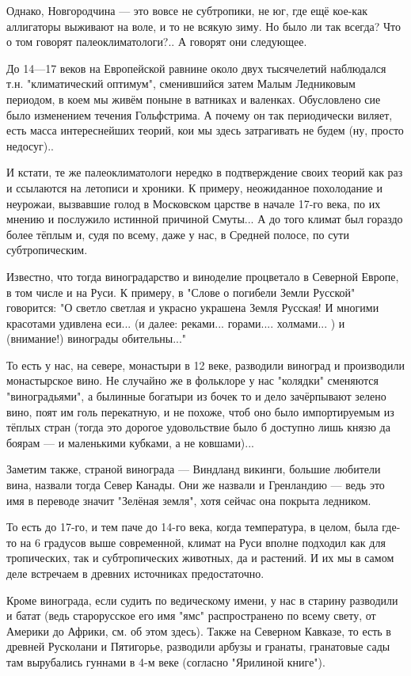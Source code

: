 Однако, Новгородчина — это вовсе не субтропики, не юг, где ещё кое-как
аллигаторы выживают на воле, и то не всякую зиму. Но было ли так всегда? Что о
том говорят палеоклиматологи?.. А говорят они следующее.

До 14—17 веков на Европейской равнине около двух тысячелетий наблюдался т.н.
"климатический оптимум", сменившийся затем Малым Ледниковым периодом, в коем мы
живём поныне в ватниках и валенках. Обусловлено сие было изменением течения
Гольфстрима. А почему он так периодически виляет, есть масса интереснейших
теорий, кои мы здесь затрагивать не будем (ну, просто недосуг)..

И кстати, те же палеоклиматологи нередко в подтверждение своих теорий как раз и
ссылаются на летописи и хроники. К примеру, неожиданное похолодание и неурожаи,
вызвавшие голод в Московском царстве в начале 17-го века, по их мнению и
послужило истинной причиной Смуты... А до того климат был гораздо более тёплым
и, судя по всему, даже у нас, в Средней полосе, по сути субтропическим.

Известно, что тогда виноградарство и виноделие процветало в Северной Европе, в
том числе и на Руси. К примеру, в "Слове о погибели Земли Русской" говорится:
"О светло светлая и украсно украшена Земля Русская! И многими красотами
удивлена еси... (и далее: реками... горами.... холмами... ) и (внимание!)
винограды обительны..."

То есть у нас, на севере, монастыри в 12 веке, разводили виноград и производили
монастырское вино. Не случайно же в фольклоре у нас "колядки" сменяются
"виноградьями", а былинные богатыри из бочек то и дело зачёрпывают зелено вино,
поят им голь перекатную, и не похоже, чтоб оно было импортируемым из тёплых
стран (тогда это дорогое удовольствие было б доступно лишь князю да боярам — и
маленькими кубками, а не ковшами)...

Заметим также, страной винограда — Виндланд викинги, большие любители вина,
назвали тогда Север Канады. Они же назвали и Гренландию — ведь это имя в
переводе значит "Зелёная земля", хотя сейчас она покрыта ледником.

То есть до 17-го, и тем паче до 14-го века, когда температура, в целом, была
где-то на 6 градусов выше современной, климат на Руси вполне подходил как для
тропических, так и субтропических животных, да и растений. И их мы в самом деле
встречаем в древних источниках предостаточно.

Кроме винограда, если судить по ведическому имени, у нас в старину разводили и
батат (ведь старорусское его имя "ямс" распространено по всему свету, от
Америки до Африки, см. об этом здесь). Также на Северном Кавказе, то есть в
древней Русколани и Пятигорье, разводили арбузы и гранаты, гранатовые сады там
вырубались гуннами в 4-м веке (согласно "Ярилиной книге").  

